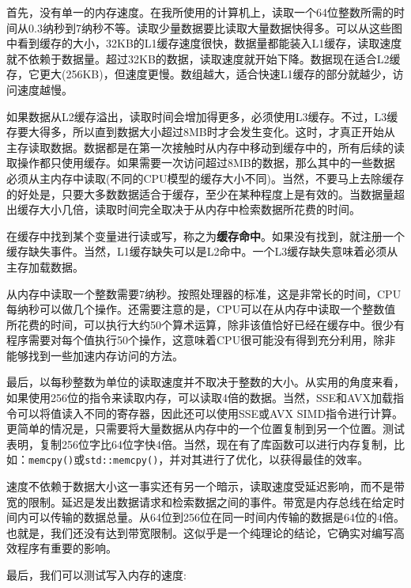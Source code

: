 首先，没有单一的内存速度。在我所使用的计算机上，读取一个64位整数所需的时间从0.3纳秒到7纳秒不等。读取少量数据要比读取大量数据快得多。可以从这些图中看到缓存的大小，32KB的L1缓存速度很快，数据量都能装入L1缓存，读取速度就不依赖于数据量。超过32KB的数据，读取速度就开始下降。数据现在适合L2缓存，它更大(256KB)，但速度更慢。数组越大，适合快速L1缓存的部分就越少，访问速度越慢。

如果数据从L2缓存溢出，读取时间会增加得更多，必须使用L3缓存。不过，L3缓存要大得多，所以直到数据大小超过8MB时才会发生变化。这时，才真正开始从主存读取数据。数据都是在第一次接触时从内存中移动到缓存中的，所有后续的读取操作都只使用缓存。如果需要一次访问超过8MB的数据，那么其中的一些数据必须从主内存中读取(不同的CPU模型的缓存大小不同)。当然，不要马上去除缓存的好处是，只要大多数数据适合于缓存，至少在某种程度上是有效的。当数据量超出缓存大小几倍，读取时间完全取决于从内存中检索数据所花费的时间。

在缓存中找到某个变量进行读或写，称之为\textbf{缓存命中}。如果没有找到，就注册一个缓存缺失事件。当然，L1缓存缺失可以是L2命中。一个L3缓存缺失意味着必须从主存加载数据。

从内存中读取一个整数需要7纳秒。按照处理器的标准，这是非常长的时间，CPU每纳秒可以做几个操作。还需要注意的是，CPU可以在从内存中读取一个整数值所花费的时间，可以执行大约50个算术运算，除非该值恰好已经在缓存中。很少有程序需要对每个值执行50个操作，这意味着CPU很可能没有得到充分利用，除非能够找到一些加速内存访问的方法。

最后，以每秒整数为单位的读取速度并不取决于整数的大小。从实用的角度来看，如果使用256位的指令来读取内存，可以读取4倍的数据。当然，SSE和AVX加载指令可以将值读入不同的寄存器，因此还可以使用SSE或AVX SIMD指令进行计算。更简单的情况是，只需要将大量数据从内存中的一个位置复制到另一个位置。测试表明，复制256位字比64位字快4倍。当然，现在有了库函数可以进行内存复制，比如：\texttt{memcpy()}或\texttt{std::memcpy()}，并对其进行了优化，以获得最佳的效率。

速度不依赖于数据大小这一事实还有另一个暗示，读取速度受延迟影响，而不是带宽的限制。延迟是发出数据请求和检索数据之间的事件。带宽是内存总线在给定时间内可以传输的数据总量。从64位到256位在同一时间内传输的数据是64位的4倍。也就是，我们还没有达到带宽限制。这似乎是一个纯理论的结论，它确实对编写高效程序有重要的影响。

最后，我们可以测试写入内存的速度:

